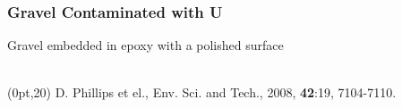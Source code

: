 \documentclass[10pt, xcolor=x11names, compress, handout]{beamer}
\begin{document}
\begin{frame}
  \frametitle{Gravel Contaminated with U}

  \begin{center}
    Gravel embedded in epoxy with a polished surface\\[1ex]

    \\[1ex]

  \end{center}

  \begin{textblock*}{0.6\linewidth}(0pt,20\TPVertModule)
    \tiny D. Phillips et el., Env. Sci. and Tech., 2008,
    \textbf{42}:19, 7104-7110.
  \end{textblock*}
\end{frame}
\end{document}
